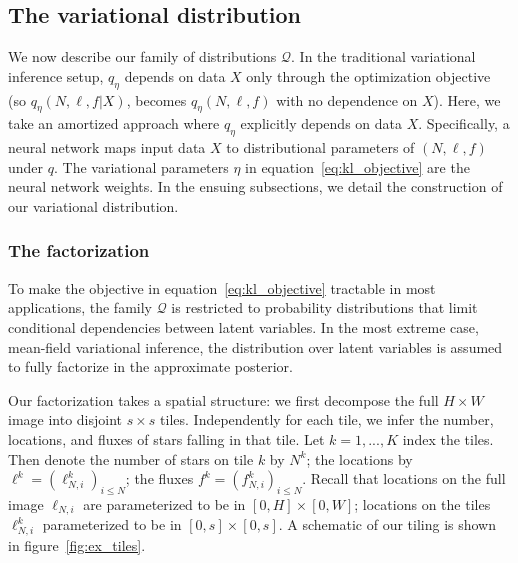 \subsection{The variational distribution}
We now describe our family of distributions $\mathcal{Q}$. 
In the traditional variational inference setup, 
$q_\eta$ depends on data $X$ only through the optimization objective 
(so $q_\eta(N, \ell, f | X)$,
becomes $q_\eta(N, \ell, f)$ with no dependence on $X$). 
Here, we take an amortized approach where
$q_\eta$ explicitly depends on data $X$. Specifically, a neural network 
maps input data $X$ to distributional parameters of $(N, \ell, f)$ 
under $q$. The variational parameters $\eta$ in equation~\eqref{eq:kl_objective} 
are the neural network weights. 
In the ensuing subsections, we detail the construction of our variational distribution. 

\subsubsection{The factorization}
To make the objective in equation~\eqref{eq:kl_objective} 
tractable in most 
applications, the family $\mathcal{Q}$ is restricted to probability distributions 
that limit conditional dependencies between latent variables. In the most extreme case, mean-field variational inference, 
the distribution over latent variables is assumed to fully factorize in the approximate posterior. 

Our factorization takes a spatial structure: we first decompose the full 
$H \times W$ image into disjoint $s \times s$ tiles. 
Independently for each tile,
we infer the number, locations, and fluxes of stars falling in that tile.
Let $k = 1, ..., K$ index the tiles. Then
denote the number of stars on tile $k$ by $N^k$;
the locations by $\ell^k = (\ell_{N, i}^k)_{i \leq N}$; 
the fluxes $f^k = (f_{N, i}^k)_{i \leq N}$. Recall that locations on the 
full image $\ell_{N, i}$ are parameterized to be in $[0, H] \times [0, W]$; 
locations on the tiles $\ell^k_{N, i}$ parameterized to be in
$[0, s] \times [0, s]$. A schematic 
of our tiling is shown in figure~\ref{fig:ex_tiles}. 

